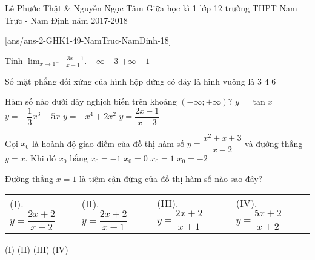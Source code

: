 \begin{name}
{Lê Phước Thật \& Nguyễn Ngọc Tâm}
{Giữa học kì 1 lớp 12 trường THPT Nam Trực - Nam Định năm 2017-2018}
\end{name}
\setcounter{ex}{0}
[ans/ans-2-GHK1-49-NamTruc-NamDinh-18]

\begin{ex}%
Tính $\displaystyle \lim_{x\to1^-} \frac{-3x-1}{x-1}$.
\choice
{$ -\infty $}
{$ -3 $}
{\True $ +\infty $}
{$ -1 $}
\end{ex}
\begin{ex}%
Số mặt phẳng đối xứng của hình hộp đứng có đáy là hình vuông là
\choice
{3}
{4}
{6}
{}
\end{ex}
\begin{ex}%
Hàm số nào dưới đây nghịch biến trên khoảng $\left({-\infty;+\infty}\right)$?
\choice
{$y = \tan  x$}
{\True $y =-\dfrac {1}{3}{x^3}-5x$}
{$y =-{x^4}+2{x^2}$}
{$y = \dfrac {{2x-1}}{{x-3}}$}
\end{ex}
\begin{ex}%
Gọi $ x_0 $ là hoành độ giao điểm của đồ thị hàm số $y = \dfrac {x^2+x+3}{x-2}$ và đường thẳng $ y = x $. Khi đó $ x_0 $ bằng
\choice
{\True $ x_0=-1 $}
{$ x_0= 0 $}
{$ x_0= 1 $}
{$ x_0=-2 $}
\end{ex}
\begin{ex}%
Đường thẳng $x = 1$ là tiệm cận đứng của đồ thị hàm số nào sao đây?\\
\begin{tabular}{llll}
(I). $y = \dfrac {{2x+2}}{{x-2}}$ &  (II). $y = \dfrac {{2x+2}}{{x-1}}$ &  (III). $y = \dfrac {{2x+2}}{{x+1}}$  & (IV). $y = \dfrac {{5x+2}}{{x+2}}$
\end{tabular}
\choice
{(I)}
{\True (II)}
{(III)}
{(IV)}
\end{ex}
